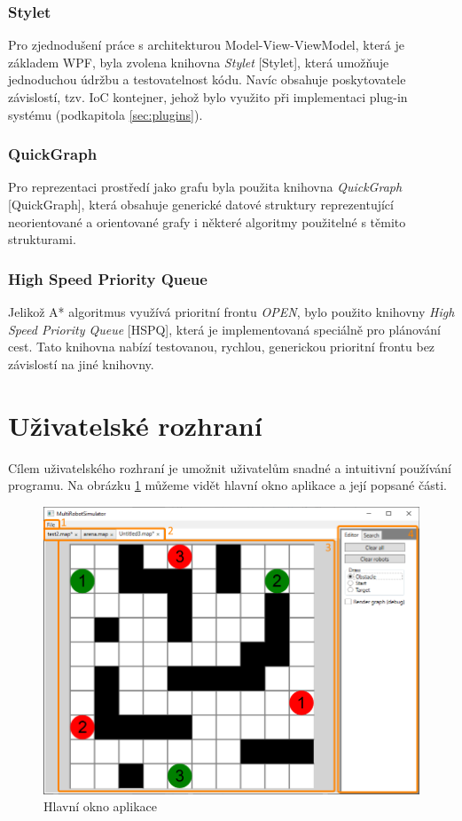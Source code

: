 \subsubsection{Stylet}
Pro zjednodušení práce s architekturou Model-View-ViewModel, která je základem WPF, byla zvolena knihovna \emph{Stylet} [Stylet], která umožňuje jednoduchou údržbu a testovatelnost kódu. Navíc obsahuje poskytovatele závislostí, tzv. IoC kontejner, jehož bylo využito při implementaci plug-in systému (podkapitola \ref{sec:plugins}).

\subsubsection{QuickGraph}
Pro reprezentaci prostředí jako grafu byla použita knihovna \emph{QuickGraph} [QuickGraph], která obsahuje generické datové struktury reprezentující neorientované a orientované grafy i některé algoritmy použitelné s těmito strukturami.

\subsubsection{High Speed Priority Queue}
Jelikož A* algoritmus využívá prioritní frontu \emph{OPEN}, bylo použito knihovny \emph{High Speed Priority Queue} [HSPQ], která je implementovaná speciálně pro plánování cest. Tato knihovna nabízí testovanou, rychlou, generickou prioritní frontu bez závislostí na jiné knihovny.

\section{Uživatelské rozhraní}
Cílem uživatelského rozhraní je umožnit uživatelům snadné a intuitivní používání programu. Na obrázku \ref{obr:gui} můžeme vidět hlavní okno aplikace a její popsané části.

\begin{figure}[htb]
	\begin{center}
		\includegraphics*[width=\textwidth,keepaspectratio]{obr/gui}
	\end{center}
	\caption[caption]{Hlavní okno aplikace}
	\label{obr:gui}
\end{figure}

